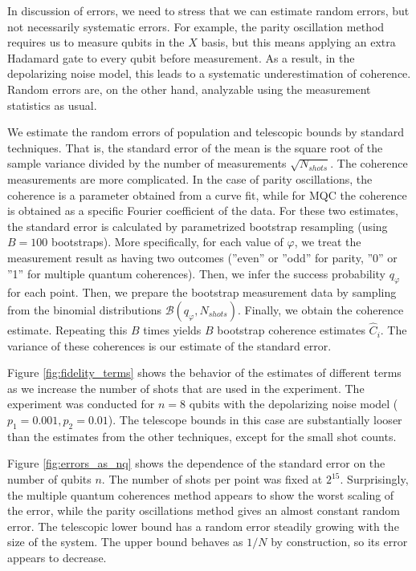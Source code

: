 In discussion of errors, we need to stress that we can estimate random errors, but not necessarily systematic errors. For example, the parity oscillation method requires us to measure qubits in the $X$ basis, but this means applying an extra Hadamard gate to every qubit before measurement. As a result, in the depolarizing noise model, this leads to a systematic underestimation of coherence. Random errors are, on the other hand, analyzable using the measurement statistics as usual.

We estimate the random errors of population and telescopic bounds by standard techniques. That is, the standard error of the mean is the square root of the sample variance divided by the number of measurements $\sqrt{N_{shots}}$. The coherence measurements are more complicated. In the case of parity oscillations, the coherence is a parameter obtained from a curve fit, while for MQC the coherence is obtained as a specific Fourier coefficient of the data. For these two estimates, the standard error is calculated by parametrized bootstrap resampling (using $B=100$ bootstraps). More specifically, for each value of $\varphi$, we treat the measurement result as having two outcomes (''even'' or ''odd'' for parity, ''0'' or ''1'' for multiple quantum coherences). Then, we infer the success probability $q_\varphi$ for each point. Then, we prepare the bootstrap measurement data by sampling from the binomial distributions $\mathcal{B}(q_\varphi, N_{shots})$. Finally, we obtain the coherence estimate. Repeating this $B$ times yields $B$ bootstrap coherence estimates $\hat{C}_i$. The variance of these coherences is our estimate of the standard error.

Figure \ref{fig:fidelity_terms} shows the behavior of the estimates of different terms as we increase the number of shots that are used in the experiment. The experiment was conducted for $n=8$ qubits with the depolarizing noise model ($p_1 = 0.001, p_2 = 0.01$). The telescope bounds in this case are substantially looser than the estimates from the other techniques, except for the small shot counts.

Figure \ref{fig:errors_as_nq} shows the dependence of the standard error on the number of qubits $n$. The number of shots per point was fixed at $2^{15}$. Surprisingly, the multiple quantum coherences method appears to show the worst scaling of the error, while the parity oscillations method gives an almost constant random error. The telescopic lower bound has a random error steadily growing with the size of the system. The upper bound behaves as $1/N$ by construction, so its error appears to decrease.

